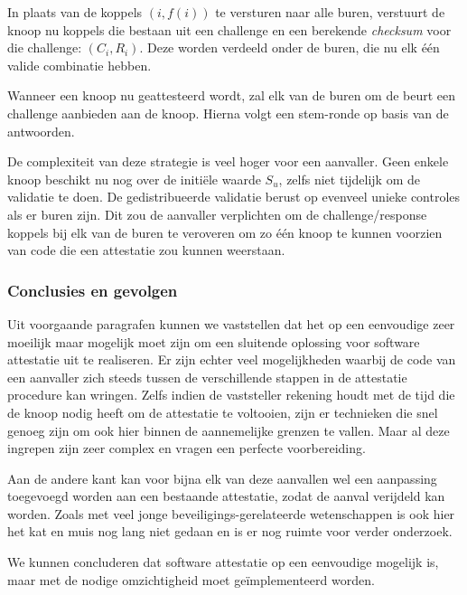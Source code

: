 In plaats van de koppels $(i, f(i))$ te versturen naar alle buren, verstuurt de
knoop nu koppels die bestaan uit een challenge en een berekende \emph{checksum}
voor die challenge: $(C_i,R_i)$. Deze worden verdeeld onder de buren, die nu
elk \'e\'en valide combinatie hebben.

Wanneer een knoop nu geattesteerd wordt, zal elk van de buren om de beurt een
challenge aanbieden aan de knoop. Hierna volgt een stem-ronde op basis van de
antwoorden.

De complexiteit van deze strategie is veel hoger voor een aanvaller. Geen
enkele knoop beschikt nu nog over de initi\"ele waarde $S_u$, zelfs niet
tijdelijk om de validatie te doen. De gedistribueerde validatie berust op
evenveel unieke controles als er buren zijn. Dit zou de aanvaller verplichten
om de challenge/response koppels bij elk van de buren te veroveren om zo
\'e\'en knoop te kunnen voorzien van code die een attestatie zou kunnen
weerstaan.

\subsubsection*{Conclusies en gevolgen}

Uit voorgaande paragrafen kunnen we vaststellen dat het op een eenvoudige \mcu
zeer moeilijk maar mogelijk moet zijn om een sluitende oplossing voor software
attestatie uit te realiseren. Er zijn echter veel mogelijkheden waarbij de code
van een aanvaller zich steeds tussen de verschillende stappen in de attestatie
procedure kan wringen. Zelfs indien de vaststeller rekening houdt met de tijd
die de knoop nodig heeft om de attestatie te voltooien, zijn er technieken die
snel genoeg zijn om ook hier binnen de aannemelijke grenzen te vallen. Maar al
deze ingrepen zijn zeer complex en vragen een perfecte voorbereiding.

Aan de andere kant kan voor bijna elk van deze aanvallen wel een aanpassing
toegevoegd worden aan een bestaande attestatie, zodat de aanval verijdeld kan
worden. Zoals met veel jonge beveiligings-gerelateerde wetenschappen is ook
hier het kat en muis nog lang niet gedaan en is er nog ruimte voor verder
onderzoek.

We kunnen concluderen dat software attestatie op een eenvoudige \mcu mogelijk
is, maar met de nodige omzichtigheid moet ge\"implementeerd worden.
